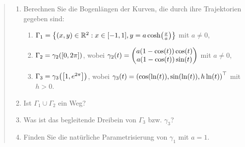 \documentclass{exercise}
\begin{document}
	\begin{quote}
		\begin{enumerate}
			\item Berechnen Sie die Bogenlängen der Kurven, die durch ihre Trajektorien gegeben sind:
			\begin{enumerate}
				\item \(\Gamma_1 = \braces*{\parentheses*{x, y} \in \R^2 : x \in \brackets*{-1, 1}, y = a\cosh\parentheses*{\frac{x}{a}}}\) mit \(a \ne 0\),
				\item \(\Gamma_2 = \gamma_2\parentheses*{\brackets*{0, 2\pi}}\), wobei \(\gamma_2\parentheses*{t} = \begin{pmatrix}
					a\parentheses*{1 - \cos\parentheses*{t}}\cos\parentheses*{t}\\
					a\parentheses*{1 - \cos\parentheses*{t}}\sin\parentheses*{t}
				\end{pmatrix}\) mit \(a \ne 0\),
				\item \(\Gamma_3 = \gamma_3\parentheses*{\brackets*{1, e^{2\pi}}}\), wobei \(\gamma_3\parentheses*{t} = \parentheses*{\cos\parentheses*{\ln\parentheses*{t}}, \sin\parentheses*{\ln\parentheses*{t}}, h\ln\parentheses*{t}}^\top\) mit \(h > 0\).
			\end{enumerate}
			\item Ist \(\Gamma_1 \cup \Gamma_2\) ein Weg?
			\item Was ist das begleitende Dreibein von \(\Gamma_3\) bzw. \(\gamma_3\)?
			\item Finden Sie die natürliche Parametrisierung von \(\gamma_1\) mit \(a = 1\).
		\end{enumerate}
	\end{quote}


	\section{}
\end{document}
